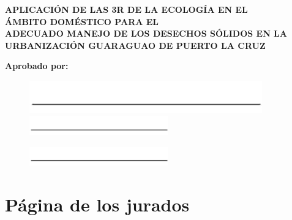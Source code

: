 \begin{center}
    \textbf{APLICACIÓN DE LAS 3R DE LA ECOLOGÍA EN EL\\
ÁMBITO DOMÉSTICO PARA EL\\ 
ADECUADO MANEJO DE LOS DESECHOS SÓLIDOS EN LA\\
URBANIZACIÓN GUARAGUAO DE PUERTO LA CRUZ}
\end{center}

\vspace*{1.5cm}

\begin{center}
    \textbf{Aprobado por:}
\end{center}

\vspace*{3cm}

\begin{figure}[h]
   \begin{minipage}{0.48\textwidth}
     \centering
     \includegraphics[width=6.cm]{Media/line.jpg}
   \end{minipage}\hfill
   \begin{minipage}{0.48\textwidth}
     \centering
     \includegraphics[width=6cm]{Media/line.jpg}
   \end{minipage}
\end{figure}

\vspace{1.5cm}

\begin{figure}[h]
    \centering
    \includegraphics[width=6cm]{Media/line.jpg}
\end{figure}

\chapter*{Página de los jurados}

\newpage